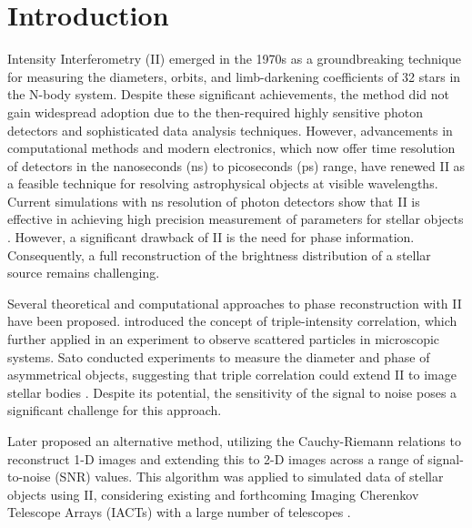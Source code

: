 \section{Introduction}

Intensity Interferometry (II) emerged in the 1970s as a groundbreaking technique for measuring the diameters, orbits, and limb-darkening coefficients of 32 stars in the N-body system. Despite these significant achievements, the method did not gain widespread adoption due to the then-required highly sensitive photon detectors and sophisticated data analysis techniques. However, advancements in computational methods and modern electronics, which now offer time resolution of detectors in the nanoseconds (ns) to picoseconds (ps) range, have renewed II as a feasible technique for resolving astrophysical objects at visible wavelengths. Current simulations with ns resolution of photon detectors show that II is effective in achieving high precision measurement of parameters for stellar objects \citep{10.1093/mnras/stab2391, 10.1093/mnras/stac2433}. However, a significant drawback of II is the need for phase information. Consequently, a full reconstruction of the brightness distribution of a stellar source remains challenging.

Several theoretical and computational approaches to phase reconstruction with II have been proposed. \citep{gamo1963triple} introduced the concept of triple-intensity correlation, which \citep{goldberger1963use} further applied in an experiment to observe scattered particles in microscopic systems. Sato conducted experiments to measure the diameter and phase of asymmetrical objects, suggesting that triple correlation could extend II to image stellar bodies \citep{sato1978imaging, sato1979computer, sato1981adaptive}. Despite its potential, the sensitivity of the signal to noise poses a significant challenge for this approach.

Later \citep{holmes2010two} proposed an alternative method, utilizing the Cauchy-Riemann relations to reconstruct 1-D images and extending this to 2-D images across a range of signal-to-noise (SNR) values. This algorithm was applied to simulated data of stellar objects using II, considering existing and forthcoming Imaging Cherenkov Telescope Arrays (IACTs) with a large number of telescopes \citep{nunez2010stellar, nunez2012high, nunez2012imaging}.

